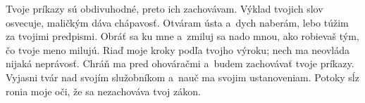 Tvoje príkazy sú obdivuhodné,
preto ich zachovávam.
\versseparator
Výklad tvojich slov osvecuje,
maličkým dáva chápavosť.
\versseparator
Otváram ústa a~dych naberám,
lebo túžim za tvojimi predpismi.
\versseparator
Obráť sa ku mne a~zmiluj sa nado mnou,
ako robievaš tým, čo tvoje meno milujú.
\versseparator
Riaď moje kroky podľa tvojho výroku;
nech ma neovláda nijaká neprávosť.
\versseparator
Chráň ma pred ohováračmi
a~budem zachovávať tvoje príkazy.
\versseparator
Vyjasni tvár nad svojím služobníkom
a~nauč ma svojim ustanoveniam.
\versseparator
Potoky sĺz ronia moje oči,
že sa nezachováva tvoj zákon. 
